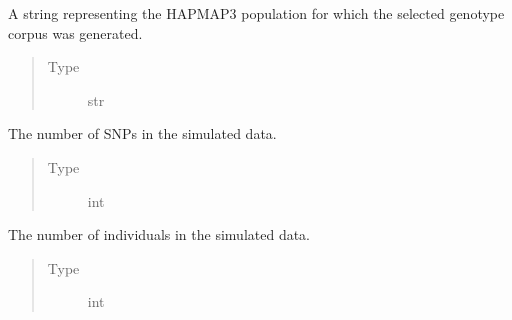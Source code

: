 \documentclass[a4paper,10pt,english]{sphinxhowto}
\begin{document}
\begin{fulllineitems}
\begin{fulllineitems}
\begin{quote}
\begin{description}
\end{description}\end{quote}

\end{fulllineitems}


\begin{fulllineitems}
\label{\detokenize{utils:utils.data_simulator.DataSimulator.pop}}
A string representing the HAPMAP3 population for which the selected genotype corpus was
generated.
\begin{quote}\begin{description}
\item[{Type}] \leavevmode
str

\end{description}\end{quote}

\end{fulllineitems}


\begin{fulllineitems}
\label{\detokenize{utils:utils.data_simulator.DataSimulator.num_snps}}
The number of SNPs in the simulated data.
\begin{quote}\begin{description}
\item[{Type}] \leavevmode
int

\end{description}\end{quote}

\end{fulllineitems}


\begin{fulllineitems}
\label{\detokenize{utils:utils.data_simulator.DataSimulator.num_inds}}
The number of individuals in the simulated data.
\begin{quote}\begin{description}
\item[{Type}] \leavevmode
int


\end{description}
\end{quote}
\end{fulllineitems}
\end{fulllineitems}
\end{document}
